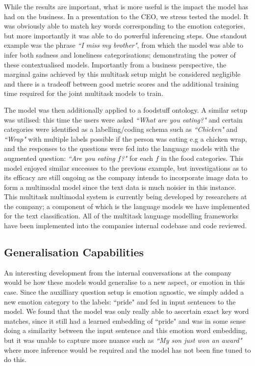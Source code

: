 While the results are important, what is more useful is the impact the model has had on the business. In a presentation to the CEO, we stress tested the model. It was obviously able to match key words corresponding to the emotion categories, but more importantly it was able to do powerful inferencing steps. One standout example was the phrase \textit{``I miss my brother"}, from which the model was able to infer both sadness and loneliness categorisations; demonstrating the power of these contextualised models. Importantly from a business perspective, the marginal gains achieved by this multitask setup might be considered negligible and there is a tradeoff between good metric scores and the additional training time required for the joint multitask models to train.

The model was then additionally applied to a foodstuff ontology. A similar setup was utilised: this time the users were asked \textit{``What are you eating?"} and certain categories were identified as a labelling/coding schema such as \textit{``Chicken"} and \textit{``Wrap"} with multiple labels possible if the person was eating e.g a chicken wrap, and the responses to the questions were fed into the language models with the augmented question: \textit{``Are you eating $f$?"} for each $f$ in the food categories. This model enjoyed similar successes to the previous example, but investigations as to its efficacy are still ongoing as the company intends to incorporate image data to form a multimodal model since the text data is much noisier in this instance. This multitask multimodal system is currently being developed by researchers at the company; a component of which is the language models we have implemented for the text classification. All of the multitask language modelling frameworks have been implemented into the companies internal codebase and code reviewed.

\subsection{Generalisation Capabilities}
An interesting development from the internal conversations at the company would be how these models would generalise to a new aspect, or emotion in this case. Since the auxilliary question setup is emotion agnostic, we simply added a new emotion category to the labels: ``pride" and fed in input sentences to the model. We found that the model was only really able to ascertain exact key word matches, since it still had a learned embedding of ``pride" and was in some sense doing a similarity between the input sentence and this emotion word embedding, but it was unable to capture more nuance such as \textit{``My son just won an award"} where more inference would be required and the model has not been fine tuned to do this.

